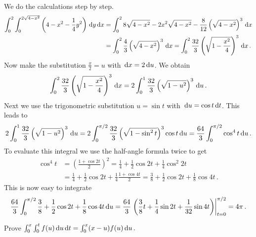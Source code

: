 \begin{solution}
We do the calculations step by step.
\begin{align*}
\int_0^2 \int_0^{2\sqrt{4-x^2}} \left( 4-x^2 - \frac 14 y^2\right) \,\mathrm{d} y \,\mathrm{d} x 
&= \int_0^2 8 \sqrt{4-x^2} - 2x^2 \sqrt{4-x^2} - \frac 8{12} \left(\sqrt{4-x^2}\right)^3 \,\mathrm{d} x \\
&= \int_0^2 \frac 43 \left( \sqrt{4-x^2} \right)^3 \,\mathrm{d} x
= \int_0^2 \frac {32}3 \left( \sqrt{1-\frac{x^2}4} \right)^3 \,\mathrm{d} x\,.
\end{align*}
Now make the substitution $\frac x2 = u$ with $\,\mathrm{d} x = 2 \,\mathrm{d} u$. We obtain
\[
\int_0^2 \frac {32}3 \left( \sqrt{1-\frac{x^2}4} \right)^3 \,\mathrm{d} x = 2 \int_0^1 \frac {32}3 \left( \sqrt{1-u^2} \right)^3 \,\mathrm{d} u\,.
\]
Next we use the trigonometric substitution $u = \sin t$ with $\,\mathrm{d} u = \cos t \,\mathrm{d} t$. This leads to
\[
2 \int_0^1 \frac {32}3 \left( \sqrt{1-u^2} \right)^3 \,\mathrm{d} u =
2 \int_0^{\pi/2} \frac {32}3 \left( \sqrt{1-\sin^2 t} \right)^3 \cos t \,\mathrm{d} u =
\frac{64}3 \int_0^{\pi/2}  \cos^4 t \,\mathrm{d} u\,.
\]
To evaluate this integral we use the half-angle formula twice to get
\begin{align*}
\cos^4 t &= \left( \frac{1 + \cos 2t}2 \right)^2 = \frac 14 + \frac 12 \cos 2t + \frac 14 \cos^2 2t \\
&= \frac 14 + \frac 12 \cos 2t + \frac 14 \frac{1 + \cos 4t}2 = \frac 38 + \frac 12 \cos 2t + \frac 18 \cos 4t\,.
\end{align*}
This is now easy to integrate
\[
\frac{64}3 \int_0^{\pi/2} \frac 38 + \frac 12 \cos 2t + \frac 18 \cos 4t \,\mathrm{d} u =
\frac{64}3 \left. \left( \frac 38 t + \frac 14 \sin 2t + \frac 1{32} \sin 4t \right) \right|_{t=0}^{\pi/2} = 4 \pi\,.
\]
\end{solution}

\begin{question}
Prove
$\int_0^x \int_0^t f(u) \,\mathrm{d} u \,\mathrm{d} t = \int_0^x (x-u) f(u) \,\mathrm{d} u\,.$
\end{question}


